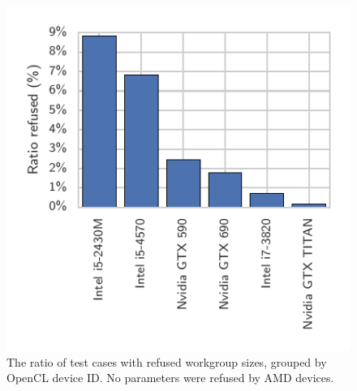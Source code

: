 \documentclass[nonatbib,preprint,10pt]{sigplanconf}
\begin{document}


\begin{figure}
  \centering
  \centering
  \includegraphics[width=.75\columnwidth]{img/refused_params_by_device}
  \caption[Refused workgroup sizes by device and vendor]{%
    The ratio of test cases with refused workgroup sizes, grouped by
    OpenCL device ID. %
    No parameters were refused by AMD devices.%
  }
\label{fig:refused-params-by-dev}
\end{figure}
\end{document}
